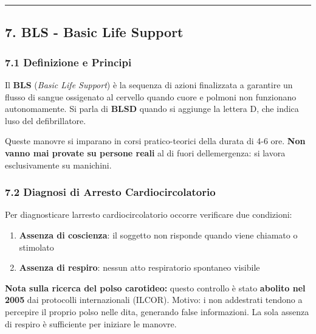\documentclass[a4paper,11pt]{article}
\providecommand{\tightlist}{%
  \setlength{\itemsep}{0pt}\setlength{\parskip}{0pt}}
\begin{document}
\begin{center}\rule{0.5\linewidth}{0.5pt}\end{center}

\subsection{7. BLS - Basic Life Support}\label{bls---basic-life-support}

\subsubsection{7.1 Definizione e Principi}\label{definizione-e-principi}

Il \textbf{BLS} (\emph{Basic Life Support}) è la sequenza di azioni
finalizzata a garantire un flusso di sangue ossigenato al cervello
quando cuore e polmoni non funzionano autonomamente. Si parla di
\textbf{BLSD} quando si aggiunge la lettera D, che indica
l\textquotesingle uso del defibrillatore.

Queste manovre si imparano in corsi pratico-teorici della durata di 4-6
ore. \textbf{Non vanno mai provate su persone reali} al di fuori
dell\textquotesingle emergenza: si lavora esclusivamente su manichini.

\subsubsection{7.2 Diagnosi di Arresto
      Cardiocircolatorio}\label{diagnosi-di-arresto-cardiocircolatorio}

Per diagnosticare l\textquotesingle arresto cardiocircolatorio occorre
verificare due condizioni:

\begin{enumerate}
      \tightlist
      \item
            \textbf{Assenza di coscienza}: il soggetto non risponde quando viene
            chiamato o stimolato
      \item
            \textbf{Assenza di respiro}: nessun atto respiratorio spontaneo
            visibile
\end{enumerate}

\textbf{Nota sulla ricerca del polso carotideo:} questo controllo è
stato \textbf{abolito nel 2005} dai protocolli internazionali (ILCOR).
Motivo: i non addestrati tendono a percepire il proprio polso nelle
dita, generando false informazioni. La sola assenza di respiro è
sufficiente per iniziare le manovre.
\end{document}

